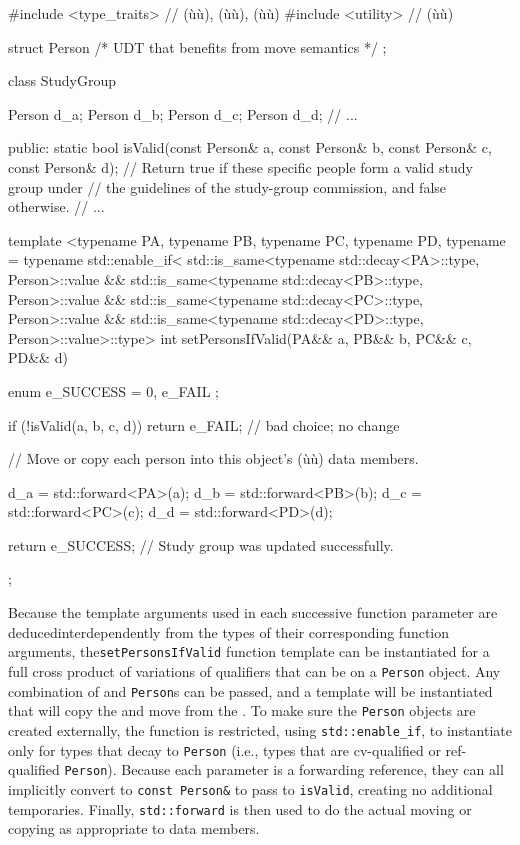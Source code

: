 \begin{emcppslisting}
#include <type_traits>  // (ù{}ù), (ù{}ù), (ù{}ù)
#include <utility>      // (ù{}ù)

struct Person { /* UDT that benefits from move semantics */ };

class StudyGroup
{
    Person d_a;
    Person d_b;
    Person d_c;
    Person d_d;
    // ...

public:
    static bool isValid(const Person& a, const Person& b,
                        const Person& c, const Person& d);
        // Return true if these specific people form a valid study group under
        // the guidelines of the study-group commission, and false otherwise.
    // ...

    template <typename PA, typename PB, typename PC, typename PD,
        typename = typename std::enable_if<
            std::is_same<typename std::decay<PA>::type, Person>::value &&
            std::is_same<typename std::decay<PB>::type, Person>::value &&
            std::is_same<typename std::decay<PC>::type, Person>::value &&
            std::is_same<typename std::decay<PD>::type, Person>::value>::type>
    int setPersonsIfValid(PA&& a, PB&& b, PC&& c, PD&& d)
    {
        enum { e_SUCCESS = 0, e_FAIL };

        if (!isValid(a, b, c, d))
        {
            return e_FAIL;  // bad choice; no change
        }

        // Move or copy each person into this object's (ù{}ù) data members.

        d_a = std::forward<PA>(a);
        d_b = std::forward<PB>(b);
        d_c = std::forward<PC>(c);
        d_d = std::forward<PD>(d);

        return e_SUCCESS;  // Study group was updated successfully.
    }
};
\end{emcppslisting}

\noindent Because the template arguments used in each successive function parameter are deduced\linebreak[4] interdependently from the types of their corresponding function arguments, the\linebreak[4] \lstinline!setPersonsIfValid! function template can be instantiated for a full cross product of variations of qualifiers that can be
on a \lstinline!Person! object. Any combination of  and
 \lstinline!Person!s can be passed, and a template will be
instantiated that will copy the  and move from the
. To make sure the \lstinline!Person! objects are
created externally, the function is restricted, using
\lstinline!std::enable_if!, to instantiate only for types that decay to
\lstinline!Person! (i.e., types that are cv-qualified or ref-qualified
\lstinline!Person!). Because each parameter is a forwarding reference, they
can all implicitly convert to \lstinline!const!~\lstinline!Person&! to pass
to \lstinline!isValid!, creating no additional temporaries. Finally,
\lstinline!std::forward! is then used to do the actual moving or copying as
appropriate to data members.

